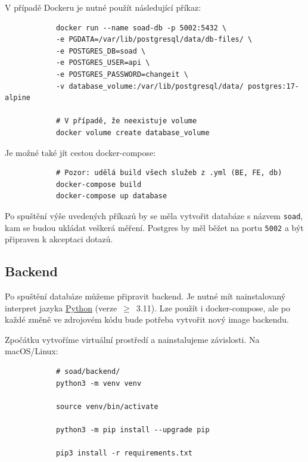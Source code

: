 \documentclass[12pt]{article}
\begin{document}
\begin{teamwork}
        V případě Dockeru je nutné použít následující příkaz:

        \begin{verbatim}
            docker run --name soad-db -p 5002:5432 \
            -e PGDATA=/var/lib/postgresql/data/db-files/ \
            -e POSTGRES_DB=soad \
            -e POSTGRES_USER=api \
            -e POSTGRES_PASSWORD=changeit \
            -v database_volume:/var/lib/postgresql/data/ postgres:17-alpine

            # V případě, že neexistuje volume
            docker volume create database_volume
        \end{verbatim}

        Je možné také jít cestou docker-compose:

        \begin{verbatim}
            # Pozor: udělá build všech služeb z .yml (BE, FE, db)
            docker-compose build
            docker-compose up database
        \end{verbatim}

        Po spuštění výše uvedených příkazů by se měla vytvořit databáze s názvem \texttt{soad}, kam se budou ukládat veškerá měření.
        Postgres by měl běžet na portu \texttt{5002} a být připraven k akceptaci dotazů.

        \subsection{Backend}\label{subsec:backend}

        Po spuštění databáze můžeme připravit backend.
        Je nutné mít nainstalovaný interpret jazyka \href{https://www.python.org/downloads/}{Python} (verze~$\geq$~3.11).
        Lze použít i docker-compose, ale po každé změně ve zdrojovém kódu bude potřeba vytvořit nový image backendu.

        Zpočátku vytvoříme virtuální prostředí a nainstalujeme závislosti.
        Na macOS/Linux:

        \begin{verbatim}
            # soad/backend/
            python3 -m venv venv

            source venv/bin/activate

            python3 -m pip install --upgrade pip

            pip3 install -r requirements.txt
        \end{verbatim}

        \clearpage


\end{teamwork}
\end{document}
